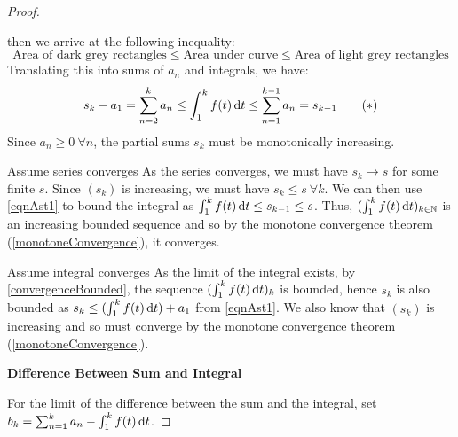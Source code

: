 \documentclass[../main.tex]{subfiles}
\begin{document}
\begin{proof}
\begin{center}
  \end{center}
  then we arrive at the following inequality:
  \[
    \text{Area of dark grey rectangles} \leq \text{Area under curve} \leq \text{Area of light grey rectangles}
  \]
  Translating this into sums of $a_n$ and integrals, we have:
  \begin{equation}
    s_k - a_1 = \sum_{n = 2}^{k} a_n \leq \int_{1}^{k} f(t) \d{t} \leq \sum_{n = 1}^{k - 1} a_n = s_{k - 1} \tag{$\ast$} \label{eqnAst1}
  \end{equation}
  Since $a_n \geq 0\ \forall n$, the partial sums $s_k$ must be monotonically increasing.
  \begin{proofdirection}{Assume series converges}
    As the series converges, we must have $s_k \to s$ for some finite $s$.
    Since $(s_k)$ is increasing, we must have $s_k \leq s\ \forall k$.
    We can then use \cref{eqnAst1} to bound the integral as $\int_{1}^{k} f(t) \d{t} \leq s_{k - 1} \leq s$.
    Thus, $(\int_{1}^{k} f(t) \d{t})_{k \in \N}$ is an increasing bounded sequence and so by the monotone convergence theorem (\cref{monotoneConvergence}), it converges.
  \end{proofdirection}
  \begin{proofdirection}{Assume integral converges}
    As the limit of the integral exists, by \cref{convergenceBounded}, the sequence $(\int_{1}^{k} f(t) \d{t})_k$ is bounded, hence $s_k$ is also bounded as $s_k \leq (\int_{1}^{k} f(t) \d{t}) + a_1$ from \cref{eqnAst1}.
    We also know that $(s_k)$ is increasing and so must converge by the monotone convergence theorem (\cref{monotoneConvergence}).
  \end{proofdirection}\par
  \textbf{Difference Between Sum and Integral}\par
  For the limit of the difference between the sum and the integral, set $b_k = \sum_{n = 1}^{k} a_n - \int_{1}^{k} f(t) \d{t}$.

\end{proof}
\end{document}
